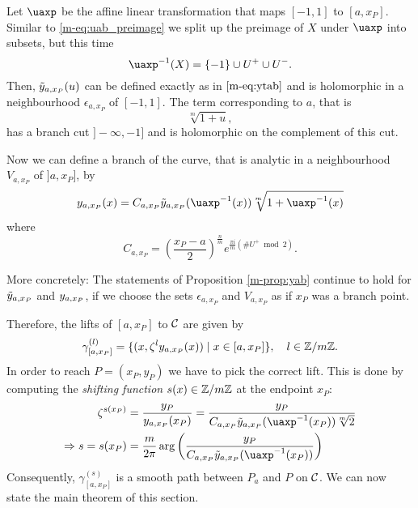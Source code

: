 \documentclass[main.tex]{subfiles}
\begin{document}
  Let  $\uaxp$ be the affine linear transformation
  that maps $[-1,1]$ to $[a,x_P]$. Similar to \eqref{m-eq:uab_preimage} we split up the preimage of $X$ under $\uaxp$ into subsets, but this time
 \begin{equation*}
  \uaxp^{-1}(X) = \{-1\} \cup U^+ \cup U^-.
 \end{equation*}
  Then, $\tilde{y}_{a,x_P}(u)$ can be defined exactly as in $\eqref{m-eq:ytab}$ and
  is holomorphic in a neighbourhood $\epsilon_{a,x_P}$ of $[-1,1]$.
  The term corresponding to $a$, that is
  \begin{equation*}
   \sqrt[m]{1+u},
  \end{equation*}
   has a branch cut $]-\infty,-1]$ and is holomorphic on the complement of this cut.
   
  Now we can define a branch of the curve,
   that is analytic in a neighbourhood $V_{a,x_P}$ of $]a,x_P]$, by
  \begin{equation*}
    \yaxp(x) =   C_{a,x_P} \ytaxp( \uaxp^{-1}(x) ) \sqrt[m]{1 + \uaxp^{-1}(x)}
  \end{equation*}
  where 
   \begin{equation*}
      C_{a,x_P} = \left(\frac{x_P-a}{2}\right)^{\frac{n}{m}} e^{\frac{\pi i}{m}(\#U^+ \bmod 2)}.
  \end{equation*}
  
  More concretely: The statements of Proposition \ref{m-prop:yab} continue to hold for $\tilde{y}_{a,x_P}$ and $y_{a,x_P}$, 
  if we choose the sets $\epsilon_{a,x_P}$ and $V_{a,x_P}$ as if $x_P$ was a branch point.
  
  Therefore, the lifts of $[a,x_P]$ to $\mathcal{C}$ are given by
    \begin{equation}\label{eq:def_path_axp}
      \gamma^{(l)}_{[a,x_P]} = \{  (x,\zeta^l y_{a,x_P}(x))  \mid  x \in [a,x_P]  \}, \quad l \in \mathbb{Z}/m\mathbb{Z}.
   \end{equation}
  In order to reach $P = (x_P,y_P)$ we have to pick the correct lift. This is done by computing the \emph{shifting function} $s(x) \in \mathbb{Z}/m\mathbb{Z}$ at the endpoint $x_P$:
  \begin{align*}
   \zeta^{s(x_P)} & = \frac{y_P}{\yaxp(x_P)} = \frac{y_P}{ C_{a,x_P} \ytaxp( \uaxp^{-1}(x_P) ) \sqrt[m]{2}  } \\
   \Rightarrow s = s(x_P) & = \frac{m}{2\pi} \arg\left(  \frac{y_P}{C_{a,x_P} \ytaxp( \uaxp^{-1}(x_P) )} \right)
  \end{align*}
  Consequently, $\gamma^{(s)}_{[a,x_P]}$ is a smooth path between $P_a$ and $P$ on $\mathcal{C}$. We can now state the main theorem of this section.
  
\end{document}
